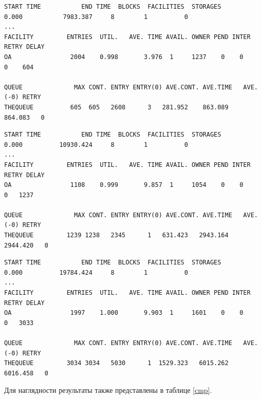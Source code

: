 \documentclass[14pt, a4paper]{extarticle}
\begin{document}
\begin{lstlisting}[caption = {Результат работы программы при $lambda\_value=4$ и $p\_reenter=0.5$ (максимальный размер очереди -- 605)}, label=lst:2]
START TIME           END TIME  BLOCKS  FACILITIES  STORAGES
0.000           7983.387     8        1          0
...
FACILITY         ENTRIES  UTIL.   AVE. TIME AVAIL. OWNER PEND INTER RETRY DELAY
OA                2004    0.998       3.976  1     1237    0    0     0    604

QUEUE              MAX CONT. ENTRY ENTRY(0) AVE.CONT. AVE.TIME   AVE.(-0) RETRY
THEQUEUE          605  605   2608      3   281.952    863.089    864.083   0
\end{lstlisting}


\begin{lstlisting}[caption = {Результат работы программы при $lambda\_value=10$ и $p\_reenter=0.1$ (максимальный размер очереди -- 1239)}, label=lst:3]
START TIME           END TIME  BLOCKS  FACILITIES  STORAGES
0.000          10930.424     8        1          0
...
FACILITY         ENTRIES  UTIL.   AVE. TIME AVAIL. OWNER PEND INTER RETRY DELAY
OA                1108    0.999       9.857  1     1054    0    0     0   1237

QUEUE              MAX CONT. ENTRY ENTRY(0) AVE.CONT. AVE.TIME   AVE.(-0) RETRY
THEQUEUE         1239 1238   2345      1   631.423   2943.164   2944.420   0
\end{lstlisting}


\begin{lstlisting}[caption = {Результат работы программы при $lambda\_value=10$ и $p\_reenter=0.5$ (максимальный размер очереди -- 3034)}, label=lst:4]
START TIME           END TIME  BLOCKS  FACILITIES  STORAGES
0.000          19784.424     8        1          0
...
FACILITY         ENTRIES  UTIL.   AVE. TIME AVAIL. OWNER PEND INTER RETRY DELAY
OA                1997    1.000       9.903  1     1601    0    0     0   3033

QUEUE              MAX CONT. ENTRY ENTRY(0) AVE.CONT. AVE.TIME   AVE.(-0) RETRY
THEQUEUE         3034 3034   5030      1  1529.323   6015.262   6016.458   0
\end{lstlisting}

\clearpage
Для наглядности результаты также представлены в таблице \ref{cmp}.
\end{document}
